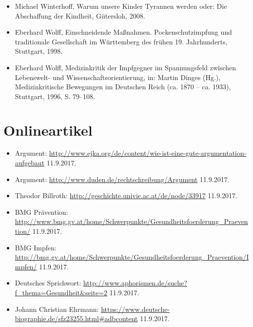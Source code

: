 \documentclass[
    a4paper,
    12pt,
    hyphens,
    chapterprefix=true,
    headheight=33pt,
    footheight=29pt,
    headings=optiontohead,
]{scrartcl}
\begin{document}
{\begin{itemize}
\item{Michael Winterhoff, Warum unsere Kinder Tyrannen werden oder: Die Abschaffung der Kindheit, Gütersloh, 2008.}
\item{Eberhard Wolff, Einschneidende Maßnahmen. Pockenschutzimpfung und traditionale Gesellschaft im Württemberg des frühen 19. Jahrhunderts, Stuttgart, 1998.}
\item{Eberhard Wolff, Medizinkritik der Impfgegner im Spannungsfeld zwischen Lebenswelt- und Wissenschaftsorientierung, in: Martin Dinges (Hg.), Medizinkritische Bewegungen im Deutschen Reich (ca. 1870 -- ca. 1933), Stuttgart, 1996, S. 79--108.}
\end{itemize}


\newpage

\section{Onlineartikel}

\begin{itemize}
\item{Argument: \url{http://www.ejka.org/de/content/wie-ist-eine-gute-argumentation-aufgebaut} 11.9.2017.}
\item{Argument: \url{http://www.duden.de/rechtschreibung/Argument} 11.9.2017.}
\item{Theodor Billroth: \url{http://geschichte.univie.ac.at/de/node/33917} 11.9.2017.}
\item{BMG Prävention: \url{http://www.bmg.gv.at/home/Schwerpunkte/Gesundheitsfoerderung_Praevention/} 11.9.2017.}
\item{BMG Impfen: \url{http://bmg.gv.at/home/Schwerpunkte/Gesundheitsfoerderung_Praevention/Impfen/} 11.9.2017.}
\item{Deutsches Sprichwort: \url{http://www.aphorismen.de/suche?f_thema=Gesundheit&seite=2} 11.9.2017.}
\item{Johann Christian Ehrmann: \url{https://www.deutsche-biographie.de/sfz23255.html#adbcontent} 11.9.2017.}


\end{itemize}}
\end{document}
